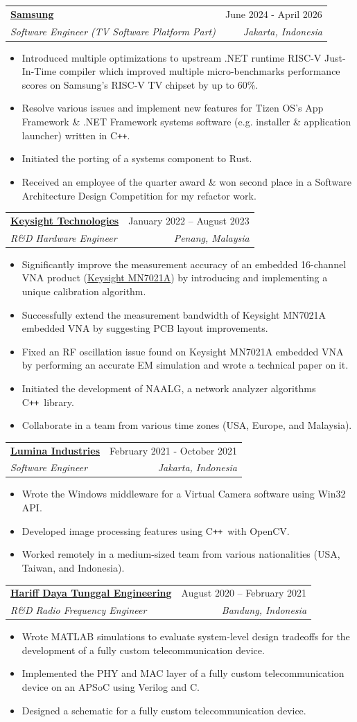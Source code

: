 \documentclass[letterpaper,11pt]{article}
\makeatletter
\newcommand{\resumeItem}[1]{
  \item\small{
    {#1 \vspace{-2pt}}
  }
}
\newcommand{\resumeSubheading}[4]{
  \vspace{-2pt}\item
    \begin{tabular*}{0.97\textwidth}[t]{l@{\extracolsep{\fill}}r}
      \textbf{#1} & #2 \\
      \textit{\small#3} & \textit{\small #4} \\
    \end{tabular*}\vspace{-7pt}
}
\newcommand{\resumeItemListStart}{\begin{itemize}}
\newcommand{\resumeItemListEnd}{\end{itemize}\vspace{-5pt}}
\newcommand\CC{C\texttt{++}}
\makeatother
\begin{document}
\resumeSubheading
{\href{https://www.samsung.com/id/srin/}{Samsung}}{June 2024 - April 2026}
{Software Engineer (TV Software Platform Part)}{Jakarta, Indonesia}
\resumeItemListStart
\resumeItem{
  Introduced multiple optimizations to upstream .NET runtime RISC-V
  Just-In-Time compiler which improved multiple micro-benchmarks performance
  scores on Samsung's RISC-V TV chipset by up to 60\%.
}
\resumeItem{
	Resolve various issues and implement new features for Tizen OS's App
	Framework \& .NET Framework systems software (e.g. installer \&
	application launcher) written in \CC.
}
\resumeItem{Initiated the porting of a systems component to Rust.}
\resumeItem{Received an employee of the quarter award \& won second place in a
Software Architecture Design Competition for my refactor work.
}
\resumeItemListEnd

\resumeSubheading
{\href{https://www.keysight.com/}{Keysight Technologies}}{January 2022 -- August 2023}
{R\&D Hardware Engineer}{Penang, Malaysia}
\resumeItemListStart
\resumeItem{
  Significantly improve the measurement accuracy of an embedded 16-channel VNA
  product
  (\href{https://www.keysight.com/us/en/assets/3125-1329/application-notes/Microwave-Sensing-Applications-in-Brain-Imaging.pdf}{Keysight
  MN7021A}) by introducing and implementing a unique calibration algorithm.
}
\resumeItem{
  Successfully extend the measurement bandwidth of Keysight MN7021A embedded
  VNA by suggesting PCB layout improvements.
}
\resumeItem{
  Fixed an RF oscillation issue found on Keysight MN7021A embedded VNA by
  performing an accurate EM simulation and wrote a technical paper on it.
}
\resumeItem{
	Initiated the development of NAALG, a network analyzer algorithms \CC\
	library.
}
\resumeItem{
	Collaborate in a team from various time zones (USA, Europe, and
	Malaysia).
}
\resumeItemListEnd

\resumeSubheading
{\href{https://getlumina.com/}{Lumina Industries}}{February 2021 - October 2021}
{Software Engineer}{Jakarta, Indonesia}
\resumeItemListStart
\resumeItem{
	Wrote the Windows middleware for a Virtual Camera software using Win32
	API.
}
\resumeItem{Developed image processing features using \CC\ with OpenCV.}
\resumeItem{
	Worked remotely in a medium-sized team from various nationalities (USA,
	Taiwan, and Indonesia).
}
\resumeItemListEnd

\resumeSubheading
{\href{https://hariff.co.id/}{Hariff Daya Tunggal Engineering}}{August 2020 -- February 2021}
{R\&D Radio Frequency Engineer}{Bandung, Indonesia}
\resumeItemListStart
\resumeItem{
	Wrote MATLAB simulations to evaluate system-level design tradeoffs for
	the development of a fully custom telecommunication device.
}
\resumeItem{
	Implemented the PHY and MAC layer of a fully custom telecommunication
	device on an APSoC using Verilog and C.
}
\resumeItem{Designed a schematic for a fully custom telecommunication device.}
\resumeItemListEnd
\end{document}
